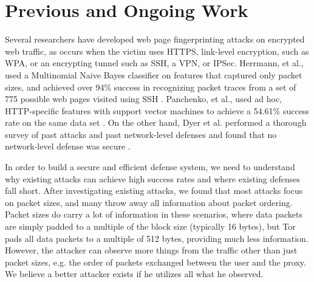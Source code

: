 \documentclass[11pt,oneside]{article}
\begin{document}
\section{Previous and Ongoing Work}

Several researchers have developed web page fingerprinting attacks on encrypted web traffic, as occurs when the victim uses HTTPS, link-level encryption, such as WPA, or an encrypting tunnel such as SSH, a VPN, or IPSec. Herrmann, et al., used a Multinomial Naive Bayes classifier on features that captured only packet sizes, and achieved over 94\% success in recognizing packet traces from a set of 775 possible web pages visited using SSH \cite{herrmann-ccsw09}. Panchenko, et al., used ad hoc, HTTP-specific features with support vector machines to achieve a 54.61\% success rate on the same data set \cite{panchenko-wpes11}. On the other hand, Dyer et al. performed a thorough survey of past attacks and past network-level defenses and found that no network-level defense was secure \cite{dyer-snp12}. 

In order to build a secure and efficient defense system, we need to understand why existing attacks can achieve high success rates and where existing defenses fall short. After investigating existing attacks, we found that most attacks focus on packet sizes, and many throw away all information about packet ordering. Packet sizes do carry a lot of information in these scenarios, where
data packets are simply padded to a multiple of the block size (typically 16 bytes), but Tor pads all data packets to
a multiple of 512 bytes, providing much less information. However, the attacker can observe more things from the traffic other than just packet sizes, e.g. the order of packets exchanged between the user and the proxy. We believe a better attacker exists if he utilizes all what he observed.
\end{document}
